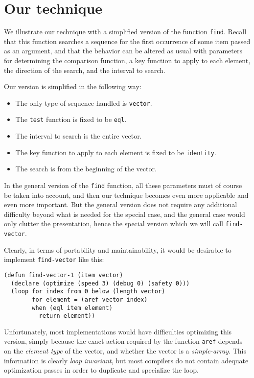 \section{Our technique}

We illustrate our technique with a simplified version of the function
\texttt{find}.  Recall that this function searches a sequence for the
first occurrence of some item passed as an argument, and that the
behavior can be altered as usual with parameters for determining the
comparison function, a key function to apply to each element, the
direction of the search, and the interval to search.

Our version is simplified in the following way:

\begin{itemize}
\item The only type of sequence handled is \texttt{vector}.
\item The \texttt{test} function is fixed to be \texttt{eql}.
\item The interval to search is the entire vector.
\item The key function to apply to each element is fixed to be
  \texttt{identity}.
\item The search is from the beginning of the vector.
\end{itemize}

In the general version of the \texttt{find} function, all these
parameters must of course be taken into account, and then our
technique becomes even more applicable and even more important.  But
the general version does not require any additional difficulty beyond
what is needed for the special case, and the general case would only
clutter the presentation, hence the special version which we will call
\texttt{find-vector}.

Clearly, in terms of portability and maintainability, it would be
desirable to implement \texttt{find-vector} like this:

{\small\begin{verbatim}
(defun find-vector-1 (item vector)
  (declare (optimize (speed 3) (debug 0) (safety 0)))
  (loop for index from 0 below (length vector)
        for element = (aref vector index)
        when (eql item element)
          return element))
\end{verbatim}}

Unfortunately, most implementations would have difficulties optimizing
this version, simply because the exact action required by the function
\texttt{aref} depends on the \emph{element type} of the vector, and
whether the vector is a \emph{simple-array}.  This information is
clearly \emph{loop invariant}, but most compilers do not contain
adequate optimization passes in order to duplicate and specialize the
loop.

